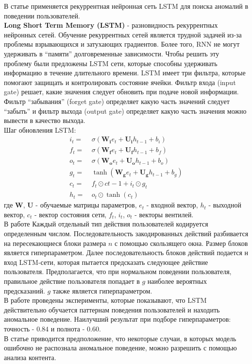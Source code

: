 В статье \cite{luInsiderThreatDetection2019} применяется рекуррентная нейронная сеть LSTM для поиска аномалий в поведении пользователей.\\
\textbf{Long Short Term Memory (LSTM)} - разновидность рекуррентных нейронных сетей. Обучение рекуррентных сетей является трудной задачей из-за проблемы взрывающихся и затухающих градиентов. Более того, RNN не могут удерживать в ``памяти'' долговременные зависимости. Чтобы решить эту проблему были предложены LSTM сети, которые способны удерживать информацию в течение длительного времени. LSTM имеет три фильтра, которые помогают защищать и контролировать состояние ячейки. Фильтр входа (input gate) решает, какие значения следует обновить при подаче новой информации. Фильтр ``забывания'' (forget gate) определяет какую часть значений следует ``забыть'' и фильтр выхода (output gate) определяет какую часть значения можно вывести в качество выхода.\\
Шаг обновления LSTM:\\
\begin{align}
i_t = &\: \sigma(\mathbf{W_i}e_t+\mathbf{U_i}h_{t-1}+b_i)\\
f_t = &\: \sigma(\mathbf{W_f}e_t+\mathbf{U_f}h_{t-1}+b_f)\\
o_t = &\: \sigma(\mathbf{W_o}e_t+\mathbf{U_o}h_{t-1}+b_o)\\
g_t = &\: \tanh(\mathbf{W_g}e_t+\mathbf{U_g}h_{t-1}+b_g)\\
c_t = &\: f_t\odot c{t-1}+i_t\odot g_t\\
h_t = &\: o_t \odot \tanh(c_t)
\end{align}
где $\mathbf{W}$, $\mathbf{U}$ - обучаемые матрицы параметров, $e_t$ - входной вектор, $h_t$ - выходной вектор, $c_t$ - вектор состояния сети, $f_t$, $i_t$, $o_t$ - векторы вентилей.\\
В работе \cite{luInsiderThreatDetection2019} Каждый отдельный тип действия пользователей кодируется определенным числом. Последовательность закодированных действий разбивается на пересекающиеся блоки размера $n$ с помощью скользящего окна. Размер блоков является гиперпараметром. Далее последовательность блоков действий подается н вход LSTM-сети, которая пытается предсказать следующее действие пользователя. Предполагается, что при нормальном поведении пользователя, правильное действие пользователя попадает в $g$ наиболее вероятных предсказаний. $g$ также является гиперпараметром.\\
В работе проведены эксперименты, которые показывают, что LSTM действительно обучается паттернам поведения пользователей и находить аномальное поведение. Наилучший результат при подборе гиперпараметров: точность - $0.84$ и полнота - $0.60$.\\
В статье приводится предположение, что некоторые случаи, в которых модель ошибочно не распознала аномальное поведение, можно разрешить с помощью анализа контента.

